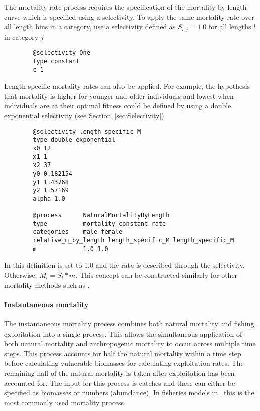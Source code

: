 The mortality rate process requires the specification of the mortality-by-length curve which is specified using a selectivity. To apply the same mortality rate over all length bins in a category, use a selectivity defined as $S_{l,j}=1.0$ for all lengths $l$ in category $j$

{\small{\begin{verbatim}
		@selectivity One
		type constant
		c 1
		\end{verbatim}}}

Length-specific mortality rates can also be applied. For example, the hypothesis that mortality is higher for younger and older individuals and lowest when individuals are at their optimal fitness could be defined by using a double exponential selectivity (see Section~\ref{sec:Selectivity})

{\small{\begin{verbatim}
		@selectivity length_specific_M
		type double_exponential
		x0 12
		x1 1
		x2 37
		y0 0.182154
		y1 1.43768
		y2 1.57169
		alpha 1.0
		
		@process      NaturalMortalityByLength
		type          mortality_constant_rate
		categories    male female
		relative_m_by_length length_specific_M length_specific_M
		m             1.0 1.0
		\end{verbatim}}}


In this definition  is set to 1.0 and the rate is described through the selectivity. Otherwise, $M_{l} = S_{l} * m$. This concept can be constructed similarly for other mortality methods such as .

\paragraph{Instantaneous mortality}\label{sec:Process-Length-MortalityInstantaneous}

The instantaneous mortality process combines both natural mortality and fishing exploitation into a single process. This allows the simultaneous application of both natural mortality and anthropogenic mortality to occur across multiple time steps. This process accounts for half the natural mortality within a time step before calculating vulnerable biomasses for calculating exploitation rates. The remaining half of the natural mortality is taken after exploitation has been accounted for. The input for this process is catches and these can either be specified as biomasses or numbers (abundance). In fisheries models in \CNAME\ this is the most commonly used mortality process.

